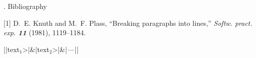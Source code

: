 . Bibliography\par %

\frenchspacing %
\item{[1]} D.~E. Knuth and M.~F. Plass, ``Breaking paragraphs
into lines,'' {\sl Softw. pract. exp. \bf11} (1981), 1119--1184.

|\+|\<text$_1$>|&|\<text$_2$>|&|$\,\cdots\,$|\cr|


\bye %